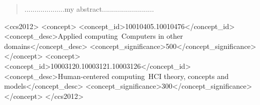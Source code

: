 \author{Nick Merrill}


\begin{abstract}
....................my abstract..........................
\end{abstract}

\begin{CCSXML}
<ccs2012>
<concept>
<concept_id>10010405.10010476</concept_id>
<concept_desc>Applied computing~Computers in other domains</concept_desc>
<concept_significance>500</concept_significance>
</concept>
<concept>
<concept_id>10003120.10003121.10003126</concept_id>
<concept_desc>Human-centered computing~HCI theory, concepts and models</concept_desc>
<concept_significance>300</concept_significance>
</concept>
</ccs2012>
\end{CCSXML}




